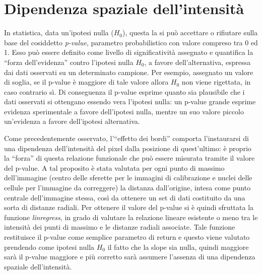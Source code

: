 \section{Dipendenza spaziale dell'intensità}

In statistica, data un'ipotesi nulla ($H_0$), questa la si può accettare o rifiutare sulla base del cosiddetto \textit{p-value}, parametro probabilistico con valore compreso tra 0 ed 1.
Esso può essere definito come livello di significatività assegnato e quantifica la ``forza dell'evidenza'' contro l'ipotesi nulla $H_0$, a favore dell'alternativa, espressa dai dati osservati su un determinato campione. 
Per esempio, assegnato un valore di soglia, se il p-value è maggiore di tale valore allora $H_0$ non viene rigettata, in caso contrario sì.
Di conseguenza il p-value esprime quanto sia plausibile che i dati osservati si ottengano essendo vera l’ipotesi nulla: un p-value grande esprime evidenza sperimentale a favore dell'ipotesi nulla, mentre un suo valore piccolo un'evidenza a favore dell'ipotesi alternativa.

Come precedentemente osservato, l'``effetto dei bordi'' comporta l'instaurarsi di una dipendenza dell'intensità del pixel dalla posizione di quest'ultimo: è proprio la ``forza'' di questa relazione funzionale che può essere misurata tramite il valore del p-value.
A tal proposito è stata valutata per ogni punto di massimo dell'immagine (centro delle sferette per le immagini di calibrazione e nuclei delle cellule per l'immagine da correggere) la distanza dall'origine, intesa come punto centrale dell'immagine stessa, così da ottenere un set di dati costituito da una sorta di distanze radiali. 
Per ottenere il valore del p-value si è quindi sfruttata la funzione \textit{linregress}, in grado di valutare la relazione lineare esistente o meno tra le intensità dei punti di massimo e le distanze radiali associate.
Tale funzione restituisce il p-value come semplice parametro di return e questo viene valutato prendendo come ipotesi nulla $H_0$ il fatto che la slope sia nulla, quindi maggiore sarà il p-value maggiore e più corretto sarà assumere l'assenza di una dipendenza spaziale dell'intensità.

